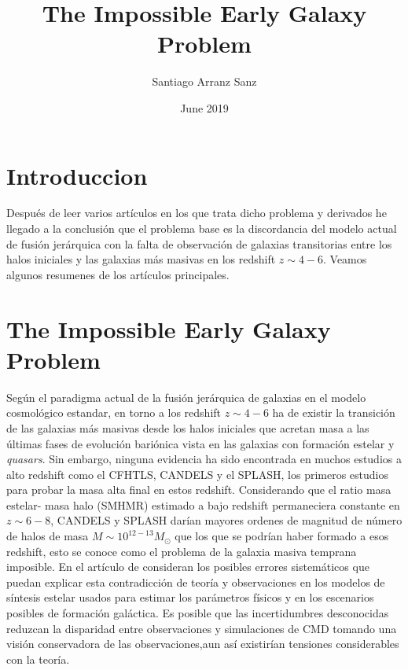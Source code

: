 \documentclass{article}
\title{The Impossible  Early Galaxy Problem}
\author{Santiago Arranz Sanz }
\date{June 2019}
\begin{document}
\maketitle

\section*{Introduccion}

Después de leer varios artículos en los que trata dicho problema y derivados he llegado a la conclusión que el problema base es la discordancia del modelo actual de fusión jerárquica con la falta de observación de galaxias transitorias entre los halos iniciales y las galaxias más masivas en los redshift $z\sim 4-6$. Veamos algunos resumenes de los artículos principales.

\section*{The Impossible Early Galaxy Problem}
\citep{steinhardt2016impossibly} Según el paradigma actual de la fusión jerárquica de galaxias en el modelo cosmológico estandar, en torno a los redshift $z\sim 4-6$ ha de existir la transición de las galaxias más masivas desde los halos iniciales que acretan masa a las últimas fases de evolución bariónica vista en las galaxias con formación estelar y \textit{quasars}. Sin embargo, ninguna evidencia ha sido encontrada en muchos estudios a alto redshift como el CFHTLS, CANDELS y el SPLASH, los primeros estudios para probar la masa alta final en estos redshift. Considerando que el ratio masa estelar- masa halo (SMHMR) estimado a bajo redshift permaneciera constante en $z\sim 6-8$, CANDELS y SPLASH darían mayores ordenes de magnitud de número de halos de masa $M\sim 10^{12-13}M_\odot$ que los que se podrían haber formado a esos redshift, esto se conoce como el problema de la galaxia masiva temprana imposible. En el artículo de \cite{steinhardt2016impossibly} consideran los posibles errores sistemáticos que puedan explicar esta contradicción de teoría y observaciones en los modelos de síntesis estelar usados para estimar los parámetros físicos  y en los escenarios posibles de formación galáctica. Es posible que las incertidumbres desconocidas reduzcan la disparidad entre observaciones y simulaciones de CMD tomando una visión conservadora de las observaciones,aun así existirían tensiones considerables con la teoría.\\
\end{document}
